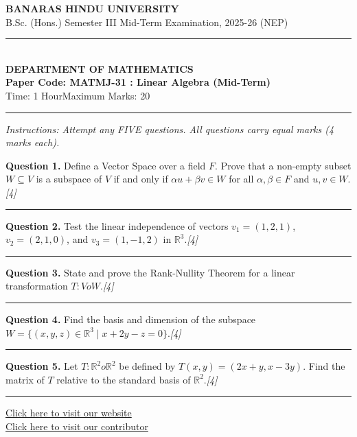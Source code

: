 \documentclass[11pt,a4paper]{article}
\newcommand{\pts}[1]{\hfill   \textit{[#1]}}
\begin{document}
\begin{center}
  {\large\bfseries BANARAS HINDU UNIVERSITY}\\[2pt]
  {\normalsize B.Sc. (Hons.) Semester III Mid-Term Examination, 2025-26 (NEP)}\\[6pt]
  \rule{0.8\linewidth}{0.5pt}\\[6pt]
  {\large\bfseries DEPARTMENT OF MATHEMATICS}\\[4pt]
  {\large\bfseries Paper Code: MATMJ-31 : Linear Algebra (Mid-Term)}\\[4pt]
  {\normalsize Time: 1 Hour\hfill Maximum Marks: 20}
\end{center}

\rule{\linewidth}{0.4pt}

\smallskip



\noindent   \textit{Instructions: Attempt any FIVE questions. All questions carry equal marks (4 marks each).}

\bigskip




\noindent   \textbf{Question 1.} Define a Vector Space over a field $F$. Prove that a non-empty subset $W \subseteq V$ is a subspace of $V$ if and only if $\alpha u + \beta v \in W$ for all $\alpha, \beta \in F$ and $u, v \in W$.\pts{4}

\medskip\rule{\linewidth}{0.2pt}\medskip




\noindent   \textbf{Question 2.} Test the linear independence of vectors $v_1 = (1, 2, 1)$, $v_2 = (2, 1, 0)$, and $v_3 = (1, -1, 2)$ in $\mathbb{R}^3$.\pts{4}

\medskip\rule{\linewidth}{0.2pt}\medskip




\noindent   \textbf{Question 3.} State and prove the Rank-Nullity Theorem for a linear transformation $T \colon V  o W$.\pts{4}

\medskip\rule{\linewidth}{0.2pt}\medskip




\noindent   \textbf{Question 4.} Find the basis and dimension of the subspace $W = \{(x, y, z) \in \mathbb{R}^3 \mid x + 2y - z = 0\}$.\pts{4}

\medskip\rule{\linewidth}{0.2pt}\medskip




\noindent   \textbf{Question 5.} Let $T \colon \mathbb{R}^2  o \mathbb{R}^2$ be defined by $T(x, y) = (2x + y, x - 3y)$. Find the matrix of $T$ relative to the standard basis of $\mathbb{R}^2$.\pts{4}

\vfill
\rule{\linewidth}{0.4pt}

\begin{center}\small
\href{https://bhu-exam.vercel.app/}{Click here to visit our website}\\[4pt]
\href{https://me-aryan.vercel.app/}{Click here to visit our contributor}
\end{center}
\end{document}
